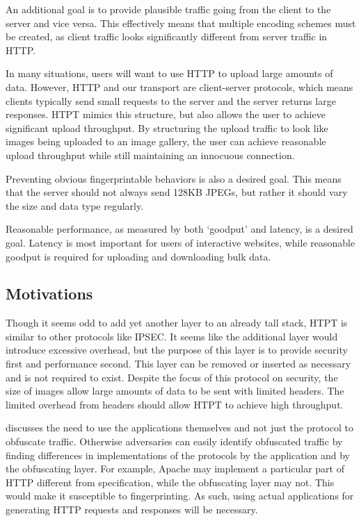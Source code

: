 An additional goal is to provide plausible traffic going from the client to the server and vice versa. This effectively means that multiple encoding schemes must be created, as client traffic looks significantly different from server traffic in HTTP. 

In many situations, users will want to use HTTP to upload large amounts of data. However, HTTP and our transport are client-server protocols, which means clients typically send small requests to the server and the server returns large responses. HTPT mimics this structure, but also allows the user to achieve significant upload throughput. By structuring the upload traffic to look like images being uploaded to an image gallery, the user can achieve reasonable upload throughput while still maintaining an innocuous connection.

Preventing obvious fingerprintable behaviors is also a desired goal. This means that the server should not always send 128KB JPEGs, but rather it should vary the size and data type regularly.  

Reasonable performance, as measured by both `goodput' and latency, is a desired goal. Latency is most important for users of interactive websites, while reasonable goodput is required for uploading and downloading bulk data. 

\subsection{Motivations}
Though it seems odd to add yet another layer to an already tall stack, HTPT is similar to other protocols like IPSEC. It seems like the additional layer would introduce excessive overhead, but the purpose of this layer is to provide security first and performance second. This layer can be removed or inserted as necessary and is not required to exist. Despite the focus of this protocol on security, the size of images allow large amounts of data to be sent with limited headers. The limited overhead from headers should allow HTPT to achieve high throughput.

\cite{Ref2} discusses the need to use the applications themselves and not just the protocol to obfuscate traffic. Otherwise adversaries can easily identify obfuscated traffic by finding differences in implementations of the protocols by the application and by the obfuscating layer. For example, Apache may implement a particular part of HTTP different from specification, while the obfuscating layer may not. This would make it susceptible to fingerprinting. As such, using actual applications for generating HTTP requests and responses will be necessary.


